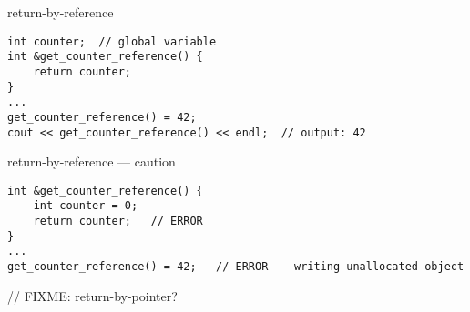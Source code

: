 \begin{frame}[fragile,label=returnByRef]{return-by-reference}
\lstset{language=C++,style=small}
\begin{lstlisting}
int counter;  // global variable
int &get_counter_reference() {
    return counter;
}
...
get_counter_reference() = 42;
cout << get_counter_reference() << endl;  // output: 42
\end{lstlisting}
\end{frame}

\begin{frame}[fragile,label=returnByRefCaution]{return-by-reference --- caution}
\lstset{language=C++,style=small}
\begin{lstlisting}
int &get_counter_reference() {
    int counter = 0;
    return counter;   // ERROR
}
...
get_counter_reference() = 42;   // ERROR -- writing unallocated object
\end{lstlisting}
\end{frame}

// FIXME: return-by-pointer?
